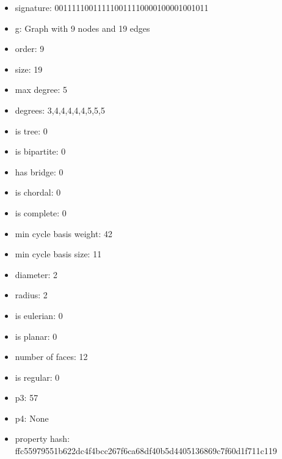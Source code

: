 \newpage
\begin{figure}
\end{figure}
\begin{itemize}
\item signature: 001111100111110011110000100001001011
\item g: Graph with 9 nodes and 19 edges
\item order: 9
\item size: 19
\item max degree: 5
\item degrees: 3,4,4,4,4,4,5,5,5
\item is tree: 0
\item is bipartite: 0
\item has bridge: 0
\item is chordal: 0
\item is complete: 0
\item min cycle basis weight: 42
\item min cycle basis size: 11
\item diameter: 2
\item radius: 2
\item is eulerian: 0
\item is planar: 0
\item number of faces: 12
\item is regular: 0
\item p3: 57
\item p4: None
\item property hash: ffc55979551b622dc4f4bcc267f6ca68df40b5d4405136869c7f60d1f711c119
\end{itemize}
